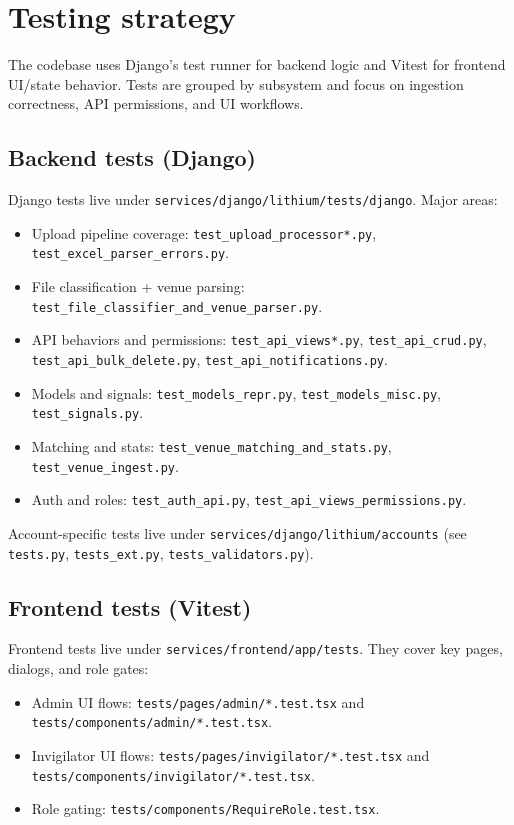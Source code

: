 \section{Testing strategy}
\label{sec:tests}

The codebase uses Django's test runner for backend logic and Vitest for frontend UI/state behavior. Tests are grouped by subsystem and focus on ingestion correctness, API permissions, and UI workflows.

\subsection{Backend tests (Django)}
\label{subsec:tests:django}

Django tests live under \texttt{services/django/lithium/tests/django}. Major areas:

\begin{itemize}
  \item Upload pipeline coverage: \texttt{test\_upload\_processor*.py}, \texttt{test\_excel\_parser\_errors.py}.
  \item File classification + venue parsing: \texttt{test\_file\_classifier\_and\_venue\_parser.py}.
  \item API behaviors and permissions: \texttt{test\_api\_views*.py}, \texttt{test\_api\_crud.py}, \texttt{test\_api\_bulk\_delete.py}, \texttt{test\_api\_notifications.py}.
  \item Models and signals: \texttt{test\_models\_repr.py}, \texttt{test\_models\_misc.py}, \texttt{test\_signals.py}.
  \item Matching and stats: \texttt{test\_venue\_matching\_and\_stats.py}, \texttt{test\_venue\_ingest.py}.
  \item Auth and roles: \texttt{test\_auth\_api.py}, \texttt{test\_api\_views\_permissions.py}.
\end{itemize}

Account-specific tests live under \texttt{services/django/lithium/accounts} (see \texttt{tests.py}, \texttt{tests\_ext.py}, \texttt{tests\_validators.py}).

\subsection{Frontend tests (Vitest)}
\label{subsec:tests:frontend}

Frontend tests live under \texttt{services/frontend/app/tests}. They cover key pages, dialogs, and role gates:

\begin{itemize}
  \item Admin UI flows: \texttt{tests/pages/admin/*.test.tsx} and \texttt{tests/components/admin/*.test.tsx}.
  \item Invigilator UI flows: \texttt{tests/pages/invigilator/*.test.tsx} and \texttt{tests/components/invigilator/*.test.tsx}.
  \item Role gating: \texttt{tests/components/RequireRole.test.tsx}.
\end{itemize}

